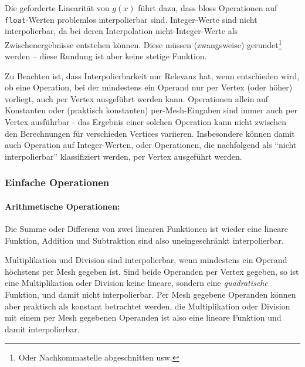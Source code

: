 \documentclass[twoside,a4paper,fleqn,12pt]{book}
\begin{document}
Die geforderte Linearität von $g(x)$ führt dazu, dass bloss Operationen auf \texttt{float}-Werten problemlos interpolierbar sind.
Integer-Werte sind nicht interpolierbar, da bei deren Interpolation nicht-Integer-Werte als Zwischenergebnisse entstehen können.
Diese müssen (zwangsweise) gerundet\footnote{Oder Nachkommastelle abgeschnitten usw.} werden -- diese Rundung
ist aber keine stetige Funktion.

Zu Beachten ist, dass Interpolierbarkeit nur Relevanz hat, wenn entschieden wird, ob eine Operation, bei der mindestens ein Operand
nur per Vertex (oder höher) vorliegt, auch per Vertex ausgeführt werden kann.
Operationen allein auf Konstanten oder (praktisch konstanten) per-Mesh-Eingaben sind immer auch per Vertex ausführbar - das Ergebnis
einer solchen Operation kann nicht zwischen den Berechnungen für verschieden Vertices variieren. Insbesondere können damit
auch Operation auf Integer-Werten, oder Operationen, die nachfolgend als "`nicht interpolierbar"' klassifiziert werden,
per Vertex ausgeführt werden.



\subsubsection{Einfache Operationen}

\paragraph{Arithmetische Operationen:} Die Summe oder Differenz von zwei linearen Funktionen
ist wieder eine lineare Funktion, Addition und Subtraktion sind also uneingeschränkt interpolierbar.

Multiplikation und Division sind interpolierbar, wenn mindestens ein Operand höchstens per Mesh gegeben ist.
Sind beide Operanden per Vertex gegeben, so ist eine Multiplikation oder Division keine lineare,
sondern eine \emph{quadratische} Funktion, und damit nicht interpolierbar. Per Mesh gegebene Operanden können aber praktisch als
konstant betrachtet werden, die Multiplikation oder Division mit einem per Mesh gegebenen
Operanden ist also eine lineare Funktion und damit interpolierbar.
\end{document}
